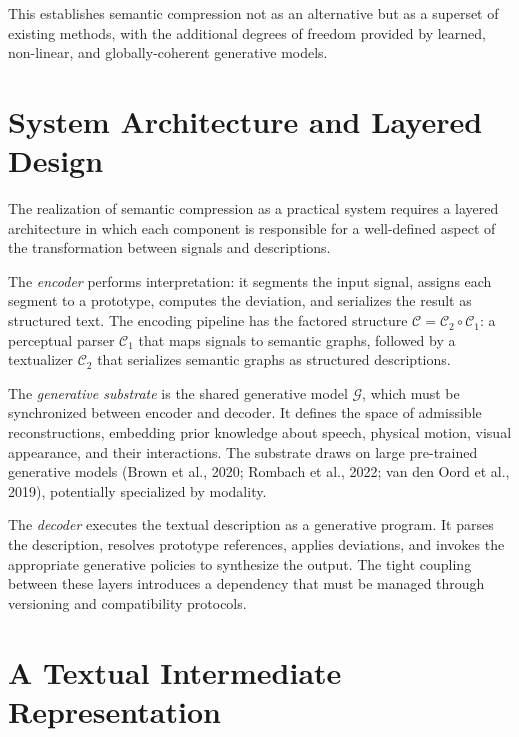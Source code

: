 \documentclass[11pt,a4paper]{article}
\theoremstyle{definition}
\theoremstyle{remark}
\begin{document}
This establishes semantic compression not as an alternative but as a superset of existing methods, with the additional degrees of freedom provided by learned, non-linear, and globally-coherent generative models.

\section{System Architecture and Layered Design}
\label{sec:architecture}

The realization of semantic compression as a practical system requires a layered architecture in which each component is responsible for a well-defined aspect of the transformation between signals and descriptions.

The \emph{encoder} performs interpretation: it segments the input signal, assigns each segment to a prototype, computes the deviation, and serializes the result as structured text. The encoding pipeline has the factored structure $\mathcal{C} = \mathcal{C}_2 \circ \mathcal{C}_1$: a perceptual parser $\mathcal{C}_1$ that maps signals to semantic graphs, followed by a textualizer $\mathcal{C}_2$ that serializes semantic graphs as structured descriptions.

The \emph{generative substrate} is the shared generative model $\mathcal{G}$, which must be synchronized between encoder and decoder. It defines the space of admissible reconstructions, embedding prior knowledge about speech, physical motion, visual appearance, and their interactions. The substrate draws on large pre-trained generative models (Brown et al., 2020; Rombach et al., 2022; van den Oord et al., 2019), potentially specialized by modality.

The \emph{decoder} executes the textual description as a generative program. It parses the description, resolves prototype references, applies deviations, and invokes the appropriate generative policies to synthesize the output. The tight coupling between these layers introduces a dependency that must be managed through versioning and compatibility protocols.

\section{A Textual Intermediate Representation}
\label{sec:TIR}
\end{document}
